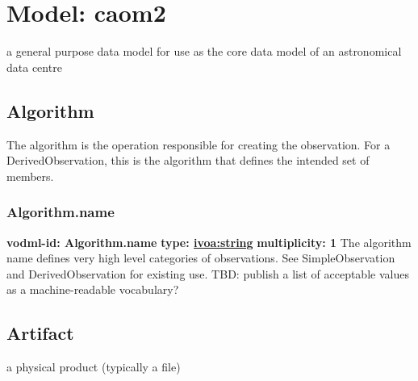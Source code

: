 
%



    
    

\pagebreak
\section{Model: caom2 }
  

  a general purpose data model for use as the core data model of an astronomical data centre

  \subsection{Algorithm}
  \label{sect:Algorithm}
    The algorithm is the operation responsible for creating the observation. For a DerivedObservation, this is the algorithm that defines the intended set of members.

    \subsubsection{Algorithm.name}
      \textbf{vodml-id: Algorithm.name} \newline
      \textbf{type: \hyperref[sect:ivoa]{ivoa:string}} \newline
      \textbf{multiplicity: 1} \newline
      The algorithm name defines very high level categories of observations. See SimpleObservation and DerivedObservation for existing use. TBD: publish a list of acceptable values as a machine-readable vocabulary?

  \subsection{Artifact}
  \label{sect:Artifact}
    a physical product (typically a file)

